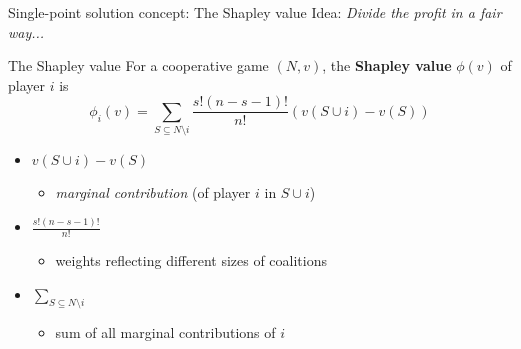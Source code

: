 \documentclass{beamer}
\begin{document}
\begin{frame}{Single-point solution concept: The Shapley value}
    Idea: \textit{Divide the profit in a fair way...}
    \begin{block}{The Shapley value}
        For a cooperative game $(N,v)$, the \textbf{Shapley value} $\phi(v)$ of player $i$ is
        \[
        \phi_i(v) = \sum_{S \subseteq N \setminus i}\frac{s!(n-s-1)!}{n!}\left(v(S \cup i) - v(S)\right)
        \]
    \end{block}
    \begin{itemize}
        \item $v(S\cup i)-v(S)$
        \begin{itemize}
            \item \textit{marginal contribution} (of player $i$ in $S \cup i$)
        \end{itemize}
        \item $\frac{s!(n-s-1)!}{n!}$ 
        \begin{itemize}
            \item weights reflecting different sizes of coalitions
        \end{itemize}
        \item $\sum_{S \subseteq N \setminus i}$
        \begin{itemize}
            \item sum of all marginal contributions of $i$
        \end{itemize}
    \end{itemize}
\end{frame}


\end{document}
